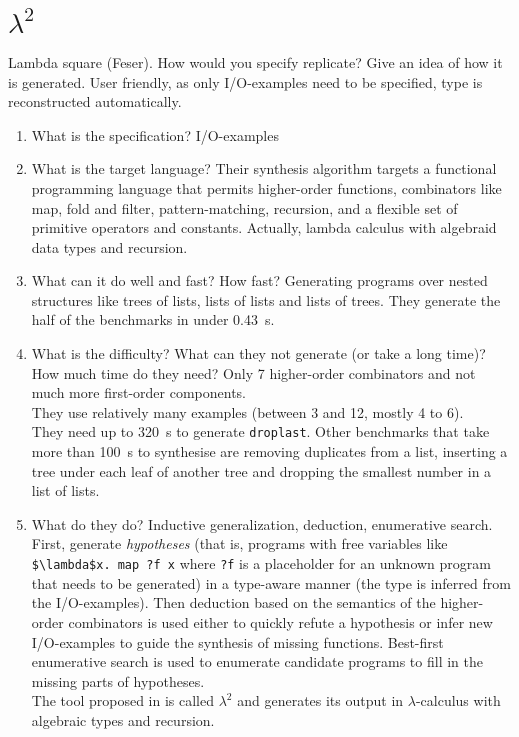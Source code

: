 \section{$\lambda^2$}
Lambda square (Feser). How would you specify replicate? Give an idea of how it is generated. User friendly, as only I/O-examples need to be specified, type is reconstructed automatically.
\begin{enumerate}
\item What is the specification?
I/O-examples
\item What is the target language?
Their synthesis algorithm targets a functional programming language that permits higher-order functions, combinators like map, fold and filter, pattern-matching, recursion, and a flexible set of primitive operators and constants. Actually, lambda calculus with algebraid data types and recursion.
\item What can it do well and fast? How fast?
Generating programs over nested structures like trees of lists, lists of lists and lists of trees. They generate the half of the benchmarks in under 0.43~s.
\item What is the difficulty? What can they not generate (or take a long time)? How much time do they need?
Only 7 higher-order combinators and not much more first-order components.\\
They use relatively many examples (between 3 and 12, mostly 4 to 6).\\
They need up to 320~s to generate \lstinline?droplast?. Other benchmarks that take more than 100~s to synthesise are removing duplicates from a list, inserting a tree under each leaf of another tree and dropping the smallest number in a list of lists.
\item What do they do?
Inductive generalization, deduction, enumerative search.
First, generate \emph{hypotheses} (that is, programs with free variables like \lstinline!$\lambda$x. map ?f x! where \lstinline!?f! is a placeholder for an unknown program that needs to be generated) in a type-aware manner (the type is inferred from the I/O-examples). Then deduction based on the semantics of the higher-order combinators is used either to quickly refute a hypothesis or infer new I/O-examples to guide the synthesis of missing functions. Best-first enumerative search is used to enumerate candidate programs to fill in the missing parts of hypotheses.\\
The tool proposed in \cite{LambdaSquarePaper} is called $\lambda^2$ and generates its output in $\lambda$-calculus with algebraic types and recursion.

\end{enumerate}
